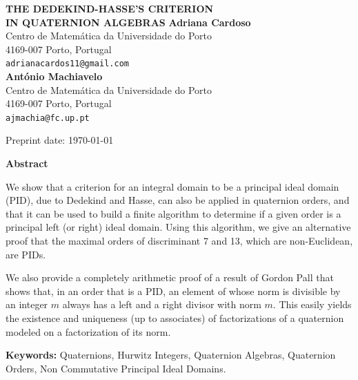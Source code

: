 \documentclass[10pt]{article}
\theoremstyle{definition}
\begin{document}
\begin{center}
  \uppercase{\bf \boldmath The Dedekind-Hasse's Criterion\\[2mm] in
    Quaternion Algebras} \vskip 20pt
  {\bf Adriana Cardoso}\\
  {\smallit Centro de Matem\'atica da Universidade do Porto \\
    4169-007
    Porto, Portugal}\\
  {\tt adrianacardos11@gmail.com}\\
  \vskip 10pt
  {\bf António Machiavelo}\\
  {\smallit Centro de Matem\'atica da Universidade do Porto \\
    4169-007
    Porto, Portugal}\\
  {\tt ajmachia@fc.up.pt}\\
\end{center}
\vskip 10pt


\centerline{Preprint date: \today}

\vskip 30pt 

\centerline{\bf Abstract}

\noindent We show that a criterion for an integral domain to be a
principal ideal domain (PID), due to Dedekind and Hasse, can also be
applied in quaternion orders, and that it can be used to build a
finite algorithm to determine if a given order is a principal left (or
right) ideal domain. Using this algorithm, we give an alternative
proof that the maximal orders of discriminant 7 and 13, which are
non-Euclidean, are PIDs.

We also provide a completely arithmetic proof of a result of Gordon
Pall that shows that, in an order that is a PID, an element of whose
norm is divisible by an integer $m$ always has a left and a right
divisor with norm $m$. This easily yields the existence and uniqueness
(up to associates) of factorizations of a quaternion modeled on a
factorization of its norm.

\vspace{2mm}
 
\noindent\small
\textbf{Keywords:} Quaternions, Hurwitz Integers, Quaternion Algebras,
Quaternion Orders, Non Commutative Principal Ideal Domains.
\normalsize

\pagestyle{headings}
\thispagestyle{empty}
\baselineskip=12.875pt
\vskip 30pt 

\end{document}
